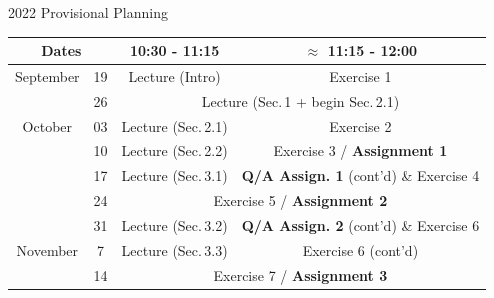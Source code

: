 \begin{frame}{2022 Provisional Planning}
\vspace{-5mm}
\begin{table}[t]
\begin{center}
\hspace{-7mm}
\begin{tabular}{|c|c|c|c|}
\hline
\multicolumn{2}{|c|}{Dates} & 10:30 - 11:15 & $\approx$ 11:15 - 12:00  \\ \hline
September & 19  & Lecture (Intro) &  Exercise 1 \\ \cline{2-4}
        & 26  & \multicolumn{2}{c|}{Lecture (Sec.\,1 + begin Sec.\,2.1)} \\ \hline
October &  03  & Lecture (Sec.\,2.1) &  Exercise 2 \\ \cline{2-4}
\hhline{|~|---|}
      & 10  &  Lecture (Sec.\,2.2) &  \cellcolor{cream} Exercise 3 / \textbf{Assignment 1} \\ \cline{2-4}
      & 17  &  Lecture (Sec.\,3.1) & \textbf{Q/A Assign. 1} (\alert{cont'd}) \& Exercise 4  \\ \cline{2-4} \cline{2-4} \hhline{|~|---|}
 & 24  &  \multicolumn{2}{c|}{\cellcolor{cream} Exercise 5 / \textbf{Assignment 2}} \\ \cline{2-4}
&  31  & Lecture (Sec.\,3.2) &  \textbf{Q/A Assign. 2} (\alert{cont'd}) \& Exercise 6 \\ \hline
  November        &  7  & Lecture (Sec.\,3.3) & Exercise 6 (\alert{cont'd})\\ \cline{2-4}
\hhline{|~|---|}
         & 14  &  \multicolumn{2}{c|}{\cellcolor{cream} Exercise 7 / \textbf{Assignment 3}} \\ \cline{2-4}

\end{tabular}
\end{center}
\end{table}
\end{frame}
